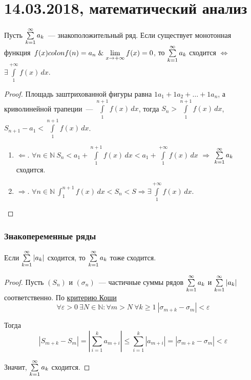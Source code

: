 \chapter{14.03.2018, математический анализ}
\begin{theorem}
Пусть $\series a_k$~--- знакоположительный ряд.
Если существует монотонная функция~$f(x) colon f(n) = a_n \mathrel{\&} \lim\limits_{x \to +\infty} f(x) = 0$, то $\series a_k$ сходится $\Leftrightarrow$ $\exists \int\limits_1^{+\infty} f(x)\,dx$.
\end{theorem}
\begin{proof}
Площадь заштрихованной фигуры равна $1 a_1 + 1 a_2 + \ldots + 1 a_n$, а криволинейной трапеции~--- $\int\limits_1^{n+1} f(x)\,dx$, тогда
$S_n > \int\limits_1^{n+1} f(x)\,dx$, $S_{n+1} - a_1 < \int\limits_1^{n+1} f(x)\,dx$.
\begin{enumerate}
	\item $\Leftarrow$. $\forall n \in \mathbb N \ S_n < a_1 + \int\limits_1^{n+1} f(x)\,dx < a_1 + \int\limits_1^{+\infty} f(x)\,dx$ $\Rightarrow$ $\series a_k$ сходится.
	\item $\Rightarrow$. $\forall n \in \mathbb N \ \int_1^{n+1} f(x)\,dx < S_n < S \Rightarrow \exists \int\limits_1^{+\infty} f(x)\,dx$.
\end{enumerate}
\end{proof}

\subsection{Знакопеременные ряды}

\begin{theorem}
Если $\series |a_k|$ сходится, то $\series a_k$ тоже сходится.
\end{theorem}
\begin{proof}
Пусть $(S_n)$ и $(\sigma_n)$~--- частичные суммы рядов $\series a_k$ и $\series |a_k|$ соответственно.
По \hyperref[th:Cauchy_criterion]{критерию Коши}
\begin{equation*}
\forall \varepsilon > 0 \ \exists N \in \mathbb N \colon \forall m > N \ \forall k \geqslant 1 \ |\sigma_{m+k} - \sigma_m| < \varepsilon
\end{equation*}

Тогда
\begin{equation*}
|S_{m+k} - S_m| = |\sum_{i=1}^k a_{m+i}| \leqslant \sum_{i=1}^k |a_{m+i}| = |\sigma_{m+k} - \sigma_m| < \varepsilon
\end{equation*}

Значит, $\series a_k$ сходится.
\end{proof}

